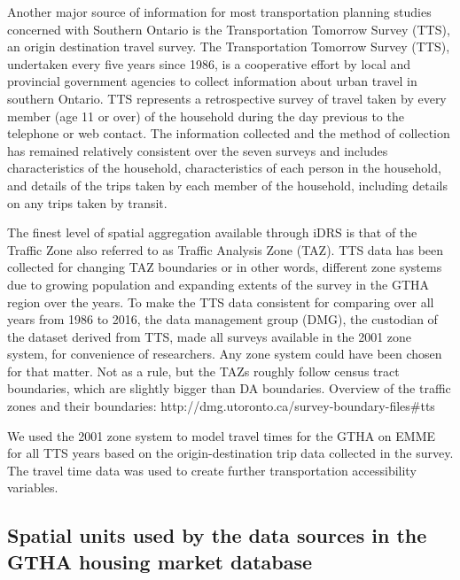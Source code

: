 Another major source of information for most transportation planning studies concerned with Southern Ontario is the Transportation Tomorrow Survey (TTS)\cite{DataManagementGroup2014}, an origin destination travel survey.
The Transportation Tomorrow Survey (TTS), undertaken every five years since 1986, is a cooperative effort by local and provincial government agencies to collect information about urban travel in southern Ontario.
TTS represents a retrospective survey of travel taken by every member (age 11 or over) of the household during the day previous to the telephone or web contact.
The information collected and the method of collection has remained relatively consistent over the seven surveys and includes characteristics of the household, characteristics of each person in the household, and details of the trips taken by each member of the household, including details on any trips taken by transit\cite{Ashby2018}.

The finest level of spatial aggregation available through iDRS is that of the Traffic Zone also referred to as Traffic Analysis Zone (TAZ).
TTS data has been collected for changing TAZ boundaries or in other words, different zone systems due to growing population and expanding extents of the survey in the GTHA region over the years.
To make the TTS data consistent for comparing over all years from 1986 to 2016, the data management group (DMG), the custodian of the dataset derived from TTS, made all surveys available in the 2001 zone system, for convenience of researchers.
Any zone system could have been chosen for that matter.
Not as a rule, but the TAZs roughly follow census tract boundaries, which are slightly bigger than DA boundaries.
Overview of the traffic zones and their boundaries: http://dmg.utoronto.ca/survey-boundary-files#tts

We used the 2001 zone system to model travel times for the GTHA on EMME for all TTS years based on the origin-destination trip data collected in the survey.
The travel time data was used to create further transportation accessibility variables.

\subsection{Spatial units used by the data sources in the GTHA housing market database} \label{subsec:spatial_units_used_in_database}


